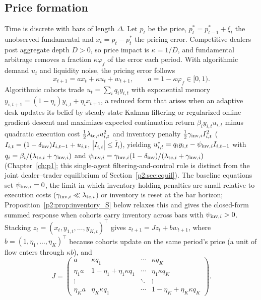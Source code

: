     \subsection{Price formation}
Time is discrete with bars of length $\Delta$. Let $p_t$ be the price, $p^*_t=p^*_{t-1}+\xi_t$ the unobserved fundamental and $x_t=p_t-p^*_t$ the pricing error. Competitive dealers post aggregate depth $D>0$, so price impact is $\kappa=1/D$, and fundamental arbitrage removes a fraction $\kappa\varphi_f$ of the error each period. With algorithmic demand $u_t$ and liquidity noise, the pricing error follows
\begin{equation}\label{p2:eq:price}
x_{t+1}=ax_t+\kappa u_t+w_{t+1},\qquad a=1-\kappa\varphi_f\in[0,1).
\end{equation}
Algorithmic cohorts trade $u_t=\sum_iq_iy_{i,t}$ with exponential memory $y_{i,t+1}=(1-\eta_i)y_{i,t}+\eta_ix_{t+1}$, a reduced form that arises when an adaptive desk updates its belief by steady-state Kalman filtering or regularized online gradient descent and maximizes expected continuation return $\beta_i y_{i,t}u_{i,t}$ minus quadratic execution cost $\tfrac12\lambda_{{\rm tc},i}u_{i,t}^2$ and inventory penalty $\tfrac12\gamma_{{\rm inv},i}I_{i,t}^2$ ($I_{i,t}=(1-\delta_{\rm inv})I_{i,t-1}+u_{i,t}$, $|I_{i,t}|\le\bar I_i$), yielding $u_{i,t}^*=q_iy_{i,t}-\psi_{{\rm inv},i}I_{i,t-1}$ with $q_i=\beta_i/(\lambda_{{\rm tc},i}+\gamma_{{\rm inv},i})$ and $\psi_{{\rm inv},i}=\gamma_{{\rm inv},i}(1-\delta_{\rm inv})/(\lambda_{{\rm tc},i}+\gamma_{{\rm inv},i})$ (Chapter~\ref{ch:p1}; this single-agent filtering-and-control rule is distinct from the joint dealer--trader equilibrium of Section~\ref{p2:sec:equil}). The baseline equations set $\psi_{{\rm inv},i}=0$, the limit in which inventory holding penalties are small relative to execution costs ($\gamma_{{\rm inv},i}\ll\lambda_{{\rm tc},i}$) or inventory is reset at the bar horizon; Proposition~\ref{p2:prop:inventory_S} below relaxes this and gives the closed-form summed response when cohorts carry inventory across bars with $\psi_{{\rm inv},i}>0$. Stacking $z_t=(x_t,y_{1,t},\ldots,y_{K,t})^\top$ gives $z_{t+1}=Jz_t+bw_{t+1}$, where $b=(1,\eta_1,\ldots,\eta_K)^\top$ because cohorts update on the same period's price (a unit of flow enters through $\kappa b$), and
\begin{equation}\label{p2:eq:J}
J=\begin{pmatrix} a & \kappa q_1 & \cdots & \kappa q_K\\ \eta_1 a & 1-\eta_1+\eta_1\kappa q_1 & \cdots & \eta_1\kappa q_K\\ \vdots & & \ddots & \vdots\\ \eta_K a & \eta_K\kappa q_1 & \cdots & 1-\eta_K+\eta_K\kappa q_K\end{pmatrix}.
\end{equation}


